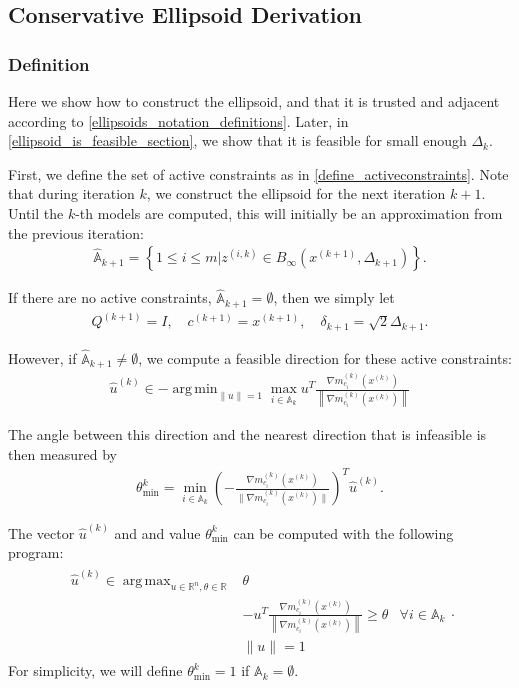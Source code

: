 \documentclass{article}
\theoremstyle{case}
\numberwithin{theorem}{subsection}
\DeclareMathOperator*{\argmin}{arg\,min}
\DeclareMathOperator*{\argmax}{arg\,max}
\newcommand{\activeconstraintsk}{{\mathbb A_{k}}}
\newcommand{\approxactiveconstraintskpo}{{\mathbb {\hat A}_{k+1}}}
\newcommand{\dk}{\Delta_k}
\newcommand{\dkpo}{\Delta_{k+1}}
\newcommand{\gmcik}{{\nabla m_{c_i}^{(k)}\left(\xk\right)}}
\newcommand{\hgik}{{\frac{\nabla m^{(k)}_{c_i}(\xk)}{\|\nabla m^{(k)}_{c_i}(\xk)\|}}}
\newcommand{\huk}{{{\hat u}^{(k)}}}
\newcommand{\reals}{\mathbb R}
\newcommand{\Rn}{\mathbb R^n}
\newcommand{\thetamink}{{\theta^k_{\textrm{min}}}}
\newcommand{\xkpo}{{{x}^{(k+1)}}}
\newcommand{\xk}{{x^{(k)}}}
\newcommand{\zik}{{z^{(i, k)}}}
\newcommand{\qkpo}{{Q^{(k+1)}}}
\newcommand{\ckpo}{{c^{(k+1)}}}
\newcommand{\sdkpo}{{\delta_{k+1}}}
\begin{document}
\subsection{Conservative Ellipsoid Derivation}
\label{conservative_ellipsoid_section}
\subsubsection{Definition}

Here we show how to construct the ellipsoid, and that it is 
trusted and adjacent
according to \cref{ellipsoids_notation_definitions}.
Later, in \cref{ellipsoid_is_feasible_section}, we show that it is feasible for small enough $\dk$.

First, we define the set of active constraints as in \cref{define_activeconstraints}.
Note that during iteration $k$, we construct the ellipsoid for the next iteration $k+1$.
Until the $k$-th models are computed, this will initially be an approximation from the previous iteration:
\begin{align}
\approxactiveconstraintskpo = \left\{1 \le i \le m | \zik \in B_{\infty}(\xkpo, \dkpo)\right\}. \label{define_active_approximation}
\end{align}

If there are no active constraints, $\approxactiveconstraintskpo = \emptyset$, then we simply let
\begin{align}
\qkpo = I, \quad \ckpo = \xkpo, \quad \sdkpo = \sqrt{2} \dkpo. \label{define_trivial_ellipsek}
\end{align}

However, if $\approxactiveconstraintskpo \ne \emptyset$, we compute a feasible direction for these active constraints:
\begin{align}
\huk \in -\argmin_{\|u\| = 1} \max_{i \in \activeconstraintsk} u^T \frac{\gmcik}{\left\|\gmcik\right\|} \label{define_u}
\end{align}


The angle between this direction and the nearest direction that is infeasible is then measured by
\begin{align}
\thetamink = \min_{i \in \activeconstraintsk} \left(-\hgik\right)^T \huk \label{define_thetamink}.
\end{align}

The vector $\huk$ and and value $\thetamink$ can be computed with the following program:
\begin{align*}
\begin{array}{ccc}
\huk \in \argmax_{u\in\Rn, \theta\in\reals} & \theta \\
& -u^T \frac{\gmcik}{\left\|\gmcik\right\|} \ge \theta & \forall i \in \activeconstraintsk \\
& \|u \| = 1& 
\end{array}.
\end{align*}
For simplicity, we will define $\thetamink = 1$ if $\activeconstraintsk = \emptyset$.
\end{document}
